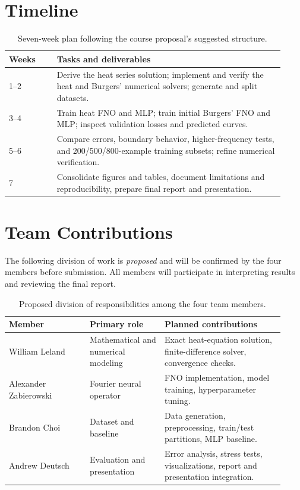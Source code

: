 \documentclass{article}
\begin{document}
\section{Timeline}
\begin{table}[H]
\centering
\caption{Seven-week plan following the course proposal's suggested structure.}
\begin{tabular}{@{}p{0.16\linewidth}p{0.76\linewidth}@{}}
\toprule
\textbf{Weeks} & \textbf{Tasks and deliverables}\\
\midrule
1--2 & Derive the heat series solution; implement and verify the heat and Burgers' numerical solvers; generate and split datasets.\\
3--4 & Train heat FNO and MLP; train initial Burgers' FNO and MLP; inspect validation losses and predicted curves.\\
5--6 & Compare errors, boundary behavior, higher-frequency tests, and 200/500/800-example training subsets; refine numerical verification.\\
7 & Consolidate figures and tables, document limitations and reproducibility, prepare final report and presentation.\\
\bottomrule
\end{tabular}
\end{table}

\section{Team Contributions}
The following division of work is \emph{proposed} and will be confirmed by the four members before submission. All members will participate in interpreting results and reviewing the final report.
\begin{table}[h]
\centering
\caption{Proposed division of responsibilities among the four team members.}
\begin{tabular}{@{}p{0.27\linewidth}p{0.25\linewidth}p{0.40\linewidth}@{}}
\toprule
\textbf{Member} & \textbf{Primary role} & \textbf{Planned contributions}\\
\midrule
William Leland & Mathematical and numerical modeling & Exact heat-equation solution, finite-difference solver, convergence checks.\\
Alexander Zabierowski & Fourier neural operator & FNO implementation, model training, hyperparameter tuning.\\
Brandon Choi & Dataset and baseline & Data generation, preprocessing, train/test partitions, MLP baseline.\\
Andrew Deutsch & Evaluation and presentation & Error analysis, stress tests, visualizations, report and presentation integration.\\
\bottomrule
\end{tabular}
\label{tab:roles}
\end{table}
\end{document}
